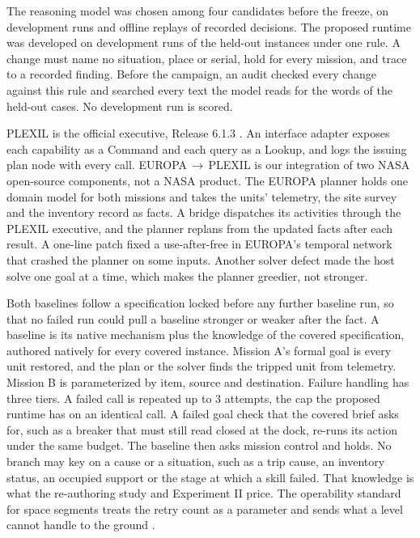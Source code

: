 The reasoning model was chosen among four candidates before the freeze, on development runs and offline replays of
recorded decisions. The proposed runtime was developed on development runs of the held-out instances under one rule. A
change must name no situation, place or serial, hold for every mission, and trace to a recorded finding. Before the
campaign, an audit checked every change against this rule and searched every text the model reads for the words of the
held-out cases. No development run is scored.

PLEXIL is the official executive, Release 6.1.3 \citep{estlin2006plexil}. An interface adapter exposes each capability
as a Command and each query as a Lookup, and logs the issuing plan node with every call. EUROPA\,$\rightarrow$\,PLEXIL is
our integration of two NASA open-source components, not a NASA product. The EUROPA planner \citep{bedraxweiss2004europa}
holds one domain model for both missions and takes the units' telemetry, the site survey and the inventory record as
facts. A bridge dispatches its activities through the PLEXIL executive, and the planner replans from the updated facts
after each result. A one-line patch fixed a use-after-free in EUROPA's temporal network that crashed the planner on some
inputs. Another solver defect made the host solve one goal at a time, which makes the planner greedier, not stronger.

Both baselines follow a specification locked before any further baseline run, so that no failed run could pull a
baseline stronger or weaker after the fact. A baseline is its native mechanism plus the knowledge of the covered
specification, authored natively for every covered instance. Mission A's formal goal is every unit restored, and the
plan or the solver finds the tripped unit from telemetry. Mission B is parameterized by item, source and destination.
Failure handling has three tiers. A failed call is repeated up to 3 attempts, the cap the proposed runtime has on an
identical call. A failed goal check that the covered brief asks for, such as a breaker that must still read closed at
the dock, re-runs its action under the same budget. The baseline then asks mission control and holds. No branch may key
on a cause or a situation, such as a trip cause, an inventory status, an occupied support or the stage at which a skill
failed. That knowledge is what the re-authoring study and Experiment II price. The operability standard for space
segments treats the retry count as a parameter and sends what a level cannot handle to the ground
\citep{ecss2008operability}.

